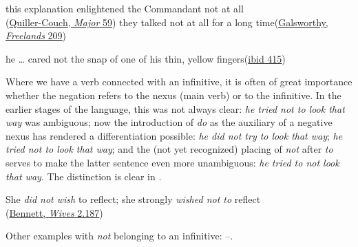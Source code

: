 \ex
this explanation enlightened the Commandant not at all\\\hfill(\href{https://archive.org/details/majorvigoureux00quil/page/58/mode/2up?q=%22enlightened%22&view=theater}{Quiller-Couch, \textit{Major} 59})
\ex
they talked not at all for a long time\hfill(\href{https://archive.org/details/freelands00galsrich/page/184/mode/2up?q=%22not+at+all+for+a+long+time%22&view=theater}{Galsworthy, \textit{Freelands} 209})
\z
\z

\ea \label{ex:05-71}
he {\dots} cared not the snap of one of his thin, yellow fingers\hfill(\href{https://archive.org/details/freelands00galsrich/page/362/mode/2up?q=%22cared+not+the+snap%22&view=theater}{ibid 415}) %
\z

Where we have a verb connected with an infinitive, it is often of great importance whether the negation refers to the nexus (main verb) or to the infinitive. In the earlier stages of the language, this was not always clear: \textit{he tried not to look that way} was ambiguous; now the introduction of \textit{do} as the auxiliary of a negative nexus has rendered a differentiation possible: \textit{he did not try to look that way}; \textit{he tried not to look that way}; and the (not yet recognized) placing of \textit{not} after \textit{to} serves to make the latter sentence even more unambiguous: \textit{he tried to not look that way}. The distinction is clear in .

\ea \label{ex:05-72}
She \textit{did not wish} to reflect; she strongly \textit{wished not to} reflect\\\hfill(\href{https://archive.org/details/cu31924013586940/page/470/mode/2up?q=%22did+not+wish+to+reflect%22&view=theater}{Bennett, \textit{Wives} 2.187})
\z{}

Other examples with \textit{not} belonging to an infinitive: --.

